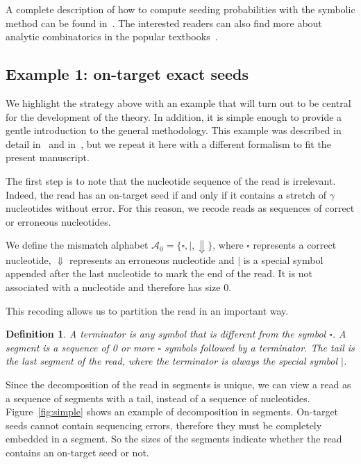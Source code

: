 \documentclass{article}
\newtheorem{definition}{Definition}
\begin{document}
A complete description of how to compute seeding probabilities with the
symbolic method can be found in~\cite{filion2017analytic,
filion2018analytic}. The interested readers can also find more about
analytic combinatorics in the popular
textbooks~\cite{flajolet2009analytic, sedgewick2013introduction}.


\subsection{Example 1: on-target exact seeds}
\label{sec:example_exact}

We highlight the strategy above with an example that will turn out to be
central for the development of the theory. In addition, it is simple
enough to provide a gentle introduction to the general methodology. This
example was described in detail in~\cite{filion2017analytic} and
in~\cite{filion2018analytic}, but we repeat it here with a different
formalism to fit the present manuscript.

The first step is to note that the nucleotide sequence of the read is
irrelevant. Indeed, the read has an on-target seed if and only if it
contains a stretch of $\gamma$ nucleotides without error. For this reason,
we recode reads as sequences of correct or erroneous nucleotides.

We define the mismatch alphabet $\mathcal{A}_0 = \{\square, |,
\Downarrow\}$, where $\square$ represents a correct nucleotide,
$\Downarrow$ represents an erroneous nucleotide and $|$ is a special
symbol appended after the last nucleotide to mark the end of the read. It
is not associated with a nucleotide and therefore has size 0.

This recoding allows us to partition the read in an important way.

\begin{definition}
\label{def:seg}
A terminator is any symbol that is different from the symbol $\square$. A
segment is a sequence of 0 or more $\square$ symbols followed by a
terminator. The tail is the last segment of the read, where the terminator
is always the special symbol $|$.
\end{definition}

Since the decomposition of the read in segments is unique, we can view a
read as a sequence of segments with a tail, instead of a sequence of
nucleotides. Figure~\ref{fig:simple} shows an example of decomposition in
segments. On-target seeds cannot contain sequencing errors, therefore they
must be completely embedded in a segment. So the sizes of the segments
indicate whether the read contains an on-target seed or not.
\end{document}
